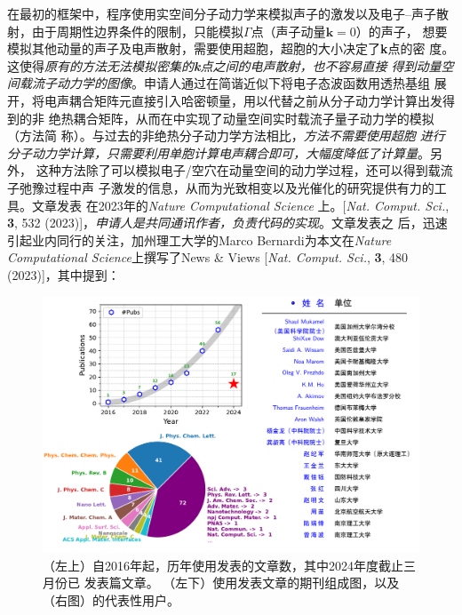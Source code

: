 在最初的\hnamd{}框架中，程序使用实空间分子动力学来模拟声子的激发以及电子--声子散
射，由于周期性边界条件的限制，只能模拟$\Gamma$点（声子动量$\mathbf{k}=0$）的声子，
想要模拟其他动量的声子及电声散射，需要使用超胞，超胞的大小决定了\textbf{k}点的密
度。这使得\emph{原有的方法无法模拟密集的\textbf{k}点之间的电声散射，也不容易直接
  得到动量空间载流子动力学的图像}。申请人通过在简谐近似下将电子态波函数用透热基组
展开，将电声耦合矩阵元直接引入哈密顿量，用以代替之前从分子动力学计算出发得到的非
绝热耦合矩阵，从而在\hnamd{}中实现了动量空间实时载流子量子动力学的模拟（方法简
称\namdk{}）。与过去的非绝热分子动力学方法相比，\emph{\namdk{}方法不需要使用超胞
  进行分子动力学计算，只需要利用单胞计算电声耦合即可，大幅度降低了计算量}。另外，
这种方法除了可以模拟电子/空穴在动量空间的动力学过程，还可以得到载流子弛豫过程中声
子激发的信息，从而为光致相变以及光催化的研究提供有力的工具。文章发表
在2023年的\textit{Nature Computational Science} 上。[\textit{Nat. Comput. Sci.},
\textbf{3}, 532 (2023)]，\emph{申请人是共同通讯作者，负责代码的实现}。文章发表之
后，迅速引起业内同行的关注，加州理工大学的Marco Bernardi为本文在\textit{Nature
  Computational Science}上撰写了News \& Views [\textit{Nat. Comput. Sci.},
\textbf{3}, 480 (2023)]，其中提到：

\begin{figure}
  \centering
  \includegraphics[width=1.0\linewidth]{figs/tikz/hefei_namd_pub_with_users.pdf}
  \caption{\label{fig:hnamd_pub_list}
    \kaishu{}%
    （左上）自2016年起，历年使用\hnamd{}发表的文章数，其中2024年度截止三月份已
    发表篇文章。
    （左下）使用\hnamd{}发表文章的期刊组成图，以及（右图）\hnamd{}的代表性用户。
  }
\end{figure}

